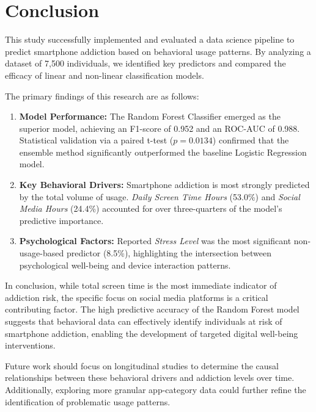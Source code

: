 \section{Conclusion}
\label{sec:conclusion}

This study successfully implemented and evaluated a data science pipeline to predict smartphone addiction based on behavioral usage patterns. By analyzing a dataset of 7,500 individuals, we identified key predictors and compared the efficacy of linear and non-linear classification models.

The primary findings of this research are as follows:
\begin{enumerate}
\item \textbf{Model Performance:} The Random Forest Classifier emerged as the superior model, achieving an F1-score of 0.952 and an ROC-AUC of 0.988. Statistical validation via a paired t-test ($p = 0.0134$) confirmed that the ensemble method significantly outperformed the baseline Logistic Regression model.
\item \textbf{Key Behavioral Drivers:} Smartphone addiction is most strongly predicted by the total volume of usage. \textit{Daily Screen Time Hours} (53.0\%) and \textit{Social Media Hours} (24.4\%) accounted for over three-quarters of the model's predictive importance.
\item \textbf{Psychological Factors:} Reported \textit{Stress Level} was the most significant non-usage-based predictor (8.5\%), highlighting the intersection between psychological well-being and device interaction patterns.
\end{enumerate}

In conclusion, while total screen time is the most immediate indicator of addiction risk, the specific focus on social media platforms is a critical contributing factor. The high predictive accuracy of the Random Forest model suggests that behavioral data can effectively identify individuals at risk of smartphone addiction, enabling the development of targeted digital well-being interventions.

Future work should focus on longitudinal studies to determine the causal relationships between these behavioral drivers and addiction levels over time. Additionally, exploring more granular app-category data could further refine the identification of problematic usage patterns.
